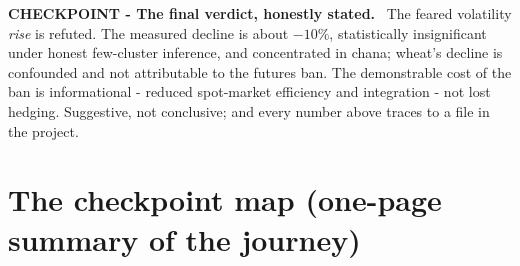 \documentclass[11pt]{article}
\newenvironment{checkpoint}[1]
  {\begin{framed}\noindent\textbf{CHECKPOINT - #1.}\ }
  {\end{framed}}
\begin{document}
\begin{checkpoint}{The final verdict, honestly stated}
The feared volatility \emph{rise} is refuted. The measured decline is about $-10\%$,
statistically insignificant under honest few-cluster inference, and concentrated in chana;
wheat's decline is confounded and not attributable to the futures ban. The demonstrable
cost of the ban is informational - reduced spot-market efficiency and integration - not
lost hedging. Suggestive, not conclusive; and every number above traces to a file in the
project.
\end{checkpoint}

\section{The checkpoint map (one-page summary of the journey)}
\end{document}
